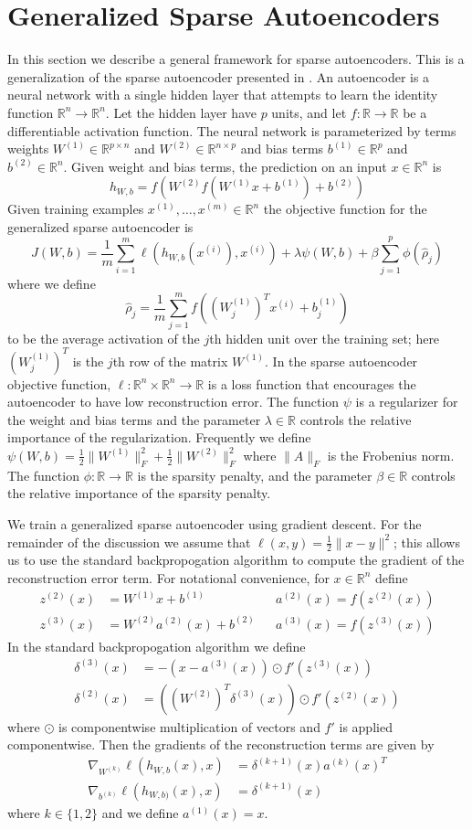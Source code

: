 \documentclass[twocolumn]{article}
\newcommand{\RR}{\mathbb{R}}
\newcommand{\ra}{\rightarrow}
\newcommand{\Wo}{W^{(1)}}
\newcommand{\Wt}{W^{(2)}}
\newcommand{\bo}{b^{(1)}}
\newcommand{\bt}{b^{(2)}}
\newcommand{\zr}{z^{(3)}}
\newcommand{\zt}{z^{(2)}}
\newcommand{\ar}{a^{(3)}}
\newcommand{\at}{a^{(2)}}
\newcommand{\ao}{a^{(1)}}
\newcommand{\dr}{\delta^{(3)}}
\newcommand{\dt}{\delta^{(2)}}
\newcommand{\xii}{x^{(i)}}
\begin{document}
\appendix
\section{Generalized Sparse Autoencoders}
\label{gen_sparse_auto}
In this section we describe a general framework for sparse autoencoders.
This is a generalization of the sparse autoencoder presented in \cite{ufldl-tutorial}.
An autoencoder is a neural network with a single hidden layer that attempts to learn the identity function
$\RR^n\ra\RR^n$. Let the hidden layer have $p$ units, and let $f:\RR\ra\RR$ be a differentiable activation
function. The neural network is parameterized by terms weights $\Wo\in\RR^{p\times n}$ and
$\Wt\in\RR^{n\times p}$ and bias terms $\bo\in\RR^p$ and $\bt\in\RR^n$. Given weight and bias terms, the
prediction on an input $x\in\RR^n$ is
\[h_{W,b}=f(\Wt f(\Wo x+\bo)+\bt)\]
Given training examples $x^{(1)},\ldots,x^{(m)}\in\RR^n$ the objective function for the generalized sparse
autoencoder is
\[J(W,b)=\frac1m\sum_{i=1}^m\ell(h_{W,b}(\xii),\xii)+\lambda\psi(W,b)+\beta\sum_{j=1}^p\phi(\hat\rho_j)\]
where we define
\[\hat\rho_j=\frac1m\sum_{j=1}^mf\left((\Wo_j)^T\xii+\bo_j\right)\]
to be the average activation of the $j$th hidden unit over the training set; here $(\Wo_j)^T$ is the
$j$th row of the matrix $\Wo$. In the sparse autoencoder objective function, $\ell:\RR^n\times\RR^n\ra\RR$
is a loss function that encourages the autoencoder to have low reconstruction error.
The function $\psi$ is a regularizer for the weight
and bias terms and the parameter $\lambda\in\RR$ controls the relative importance of the regularization.
Frequently we define $\psi(W,b)=\frac12\|\Wo\|^2_F+\frac12\|\Wt\|^2_F$ where $\|A\|_F$ is the Frobenius norm.
The function $\phi:\RR\ra\RR$ is the sparsity penalty, and the parameter $\beta\in\RR$ controls the relative
importance of the sparsity penalty.

We train a generalized sparse autoencoder using gradient descent.
For the remainder of the discussion we assume that $\ell(x,y)=\frac12\|x-y\|^2$;
this allows us to use the standard backpropogation algorithm to compute
the gradient of the reconstruction error term. For notational convenience, for $x\in\RR^n$ define
\begin{align*}
  \zt(x) &=\Wo x+\bo && \at(x) = f(\zt(x)) \\
  \zr(x) &=\Wt\at(x)+\bt && \ar(x) = f(\zr(x))
\end{align*}
In the standard backpropogation algorithm we define
\begin{align*}
  \dr(x) &= -(x-\ar(x))\odot f'(\zr(x)) \\
  \dt(x) &= \left((\Wt)^T\dr(x)\right)\odot f'(\zt(x))
\end{align*}
where $\odot$ is componentwise multiplication of vectors and $f'$ is applied componentwise.
Then the gradients of the reconstruction terms are given by
\begin{align*}
  \nabla_{W^{(k)}}\ell(h_{W,b}(x),x) &= \delta^{(k+1)}(x)a^{(k)}(x)^T \\
  \nabla_{b^{(k)}}\ell(h_{W,b)}(x),x) &= \delta^{(k+1)}(x)
\end{align*}
where $k\in\{1,2\}$ and we define $\ao(x)=x$.
\end{document}
